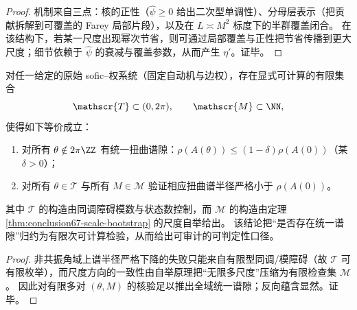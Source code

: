 \begin{proof}
机制来自三点：核的正性（\(\widehat\psi\ge 0\) 给出二次型单调性）、分母层表示（把贡献拆解到可覆盖的 Farey 局部片段），以及在 \(L\asymp M^2\) 标度下的半群覆盖闭合。
在该结构下，若某一尺度出现幂次节省，则可通过局部覆盖与正性把节省传播到更大尺度；细节依赖于 \(\widehat\psi\) 的衰减与覆盖参数，从而产生 \(\eta'\)。证毕。
\end{proof}

\begin{theorem}\label{thm:conclusion68-finite-verification}
对任一给定的原始 sofic--权系统（固定自动机与边权），存在显式可计算的有限集合
\[
\mathscr{T}\subset(0,2\pi),\qquad \mathscr{M}\subset\NN,
\]
使得如下等价成立：
\begin{enumerate}
  \item 对所有 \(\theta\notin 2\pi\ZZ\) 有统一扭曲谱隙：\(\rho(A(\theta))\le (1-\delta)\rho(A(0))\)（某 \(\delta>0\)）；
  \item 对所有 \(\theta\in\mathscr{T}\) 与所有 \(M\in\mathscr{M}\) 验证相应扭曲谱半径严格小于 \(\rho(A(0))\)。
\end{enumerate}
其中 \(\mathscr{T}\) 的构造由同调障碍模数与状态数控制，而 \(\mathscr{M}\) 的构造由定理 \ref{thm:conclusion67-scale-bootstrap} 的尺度自举给出。
该结论把“是否存在统一谱隙”归约为有限次可计算检验，从而给出可审计的可判定性口径。
\end{theorem}

\begin{proof}
非共振角域上谱半径严格下降的失败只能来自有限型同调/模障碍（故 \(\mathscr{T}\) 可有限枚举），而尺度方向的一致性由自举原理把“无限多尺度”压缩为有限检查集 \(\mathscr{M}\)。
因此对有限多对 \((\theta,M)\) 的核验足以推出全域统一谱隙；反向蕴含显然。证毕。
\end{proof}
